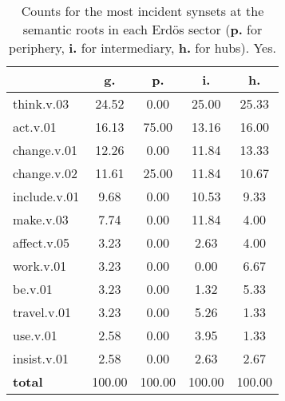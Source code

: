 \begin{table}[h!]
\begin{center}
\begin{tabular}{| l || c | c | c | c |}\hline
 & {\bf g.} & {\bf p.} & {\bf i.} & {\bf h.} \\\hline\hline
think.v.03 & 24.52  & 0.00  & 25.00  & 25.33 \\\hline
act.v.01 & 16.13  & 75.00  & 13.16  & 16.00 \\\hline
change.v.01 & 12.26  & 0.00  & 11.84  & 13.33 \\\hline
change.v.02 & 11.61  & 25.00  & 11.84  & 10.67 \\\hline
include.v.01 & 9.68  & 0.00  & 10.53  & 9.33 \\\hline
make.v.03 & 7.74  & 0.00  & 11.84  & 4.00 \\\hline
affect.v.05 & 3.23  & 0.00  & 2.63  & 4.00 \\\hline
work.v.01 & 3.23  & 0.00  & 0.00  & 6.67 \\\hline
be.v.01 & 3.23  & 0.00  & 1.32  & 5.33 \\\hline
travel.v.01 & 3.23  & 0.00  & 5.26  & 1.33 \\\hline
use.v.01 & 2.58  & 0.00  & 3.95  & 1.33 \\\hline
insist.v.01 & 2.58  & 0.00  & 2.63  & 2.67 \\\hline\hline
{{\bf total}} & 100.00  & 100.00  & 100.00  & 100.00 \\\hline
\end{tabular}
\caption{Counts for the most incident synsets at the semantic roots in each Erd\"os sector ({\bf p.} for periphery, {\bf i.} for intermediary, {\bf h.} for hubs). Yes.}
\end{center}
\end{table}